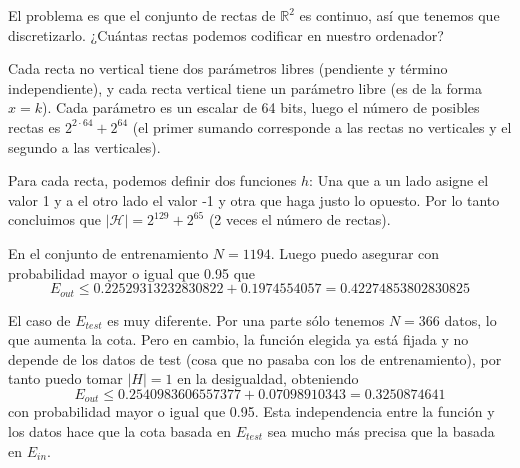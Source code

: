\documentclass[a4]{article}
\begin{document}
El problema es que el conjunto de rectas de $\mathbb{R}^2$ es
continuo, así que tenemos que discretizarlo.
¿Cuántas rectas podemos codificar en nuestro ordenador?

Cada recta no vertical tiene dos parámetros libres (pendiente y término
independiente), y cada recta vertical tiene un parámetro libre (es de la
forma $x=k$). Cada parámetro es un escalar de 64 bits, luego el número de posibles
rectas es $2^{2\cdot 64}+2^{64}$ (el primer sumando corresponde a las rectas
no verticales y el segundo a las verticales).

Para cada recta, podemos definir dos funciones $h$:
Una que a un lado asigne el valor 1 y a el otro lado
el valor -1 y otra que haga justo lo opuesto. Por lo
tanto concluimos que $|\mathcal{H}|=2^{129}+2^{65}$ (2 veces el número de rectas).

En el conjunto de entrenamiento $N=1194$. Luego puedo asegurar con probabilidad mayor o igual que 0.95 que
\[E_{out}\leq 0.22529313232830822 + 0.1974554057 = 0.42274853802830825\]

El caso de $E_{test}$ es muy diferente. Por una parte sólo tenemos
$N=366$ datos, lo que aumenta la cota. Pero en cambio, la función elegida
ya está fijada y no depende de los datos de test (cosa que no pasaba con los
de entrenamiento), por tanto puedo tomar $|H|=1$ en la desigualdad, obteniendo
\[E_{out}\leq 0.2540983606557377 + 0.07098910343 = 0.3250874641\]
con probabilidad mayor o igual que 0.95. Esta independencia entre la función y
los datos hace que la cota basada en $E_{test}$ sea mucho más precisa que la
basada en $E_{in}$.
\end{document}
